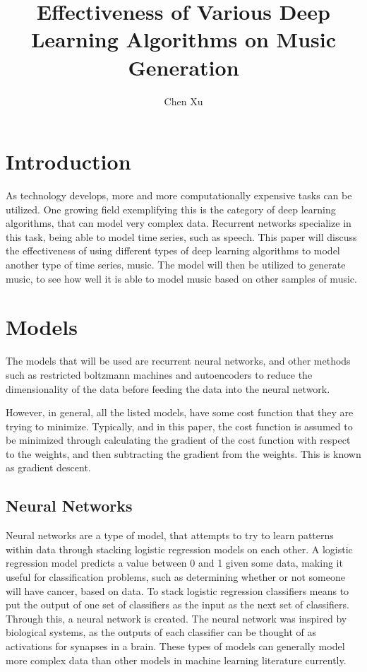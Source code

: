 \documentclass{article}
\begin{document}
\author{Chen Xu}
\title{Effectiveness of Various Deep Learning Algorithms on Music Generation}
\maketitle

\section{Introduction}
As technology develops, more and more computationally expensive tasks can be
utilized. One growing field exemplifying this is the category of deep learning
algorithms, that can model very complex data.  Recurrent networks specialize in
this task, being able to model time series, such as speech. This paper will
discuss the effectiveness of using different types of deep learning algorithms
to model another type of time series, music. The model will then be utilized to
generate music, to see how well it is able to model music based on other samples
of music.

\section{Models}
The models that will be used are recurrent neural networks, and other methods
such as restricted boltzmann machines and autoencoders to reduce the
dimensionality of the data before feeding the data into the neural network.

However, in general, all the listed models, have some cost function that they
are trying to minimize. Typically, and in this paper, the cost function is
assumed to be minimized through calculating the gradient of the cost function
with respect to the weights, and then subtracting the gradient from the weights.
This is known as gradient descent.

\subsection{Neural Networks}
Neural networks are a type of model, that attempts to try to learn patterns
within data through stacking logistic regression models on each other. A
logistic regression model predicts a value between 0 and 1 given some data,
making it useful for classification problems, such as determining whether or not
someone will have cancer, based on data. To stack logistic regression
classifiers means to put the output of one set of classifiers as the input as
the next set of classifiers. Through this, a neural network is created. The
neural network was inspired by biological systems, as the outputs of each
classifier can be thought of as activations for synapses in a brain. These types
of models can generally model more complex data than other models in machine
learning literature currently.
\end{document}
